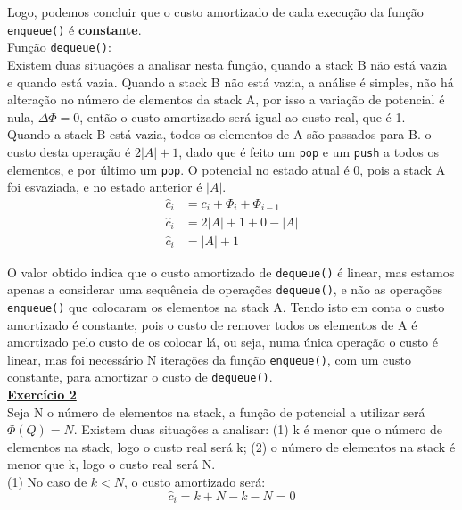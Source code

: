 \documentclass[a4paper,11pt]{article}
\begin{document}
	\noindent Logo, podemos concluir que o custo amortizado de cada execução da função \texttt{enqueue()} é \textbf{constante}.\\
	
	\noindent Função \texttt{dequeue()}:\\
	
	\noindent Existem duas situações a analisar nesta função, quando a stack B não está vazia e quando está vazia. Quando a stack B não está vazia, a análise é simples, não há alteração no número de elementos da stack A, por isso a variação de potencial é nula, $\Delta \Phi = 0$, então o custo amortizado será igual ao custo real, que é 1.\\
	
	\noindent Quando a stack B está vazia, todos os elementos de A são passados para B. o custo desta operação é $ 2 |A| + 1 $, dado que é feito um \texttt{pop} e um \texttt{push} a todos os elementos, e por último um \texttt{pop}. O potencial no estado atual é 0, pois a stack A foi esvaziada, e no estado anterior é $|A|$.
	\begin{align*}
		\hat{c}_i & = c_i + \Phi_i + \Phi_{i-1} \\
		\hat{c}_i & = 2 |A| + 1 + 0 - |A| \\
		\hat{c}_i & = |A| + 1
	\end{align*}
		
	\noindent O valor obtido indica que o custo amortizado de \texttt{dequeue()} é linear, mas estamos apenas a considerar uma sequência de operações \texttt{dequeue()}, e não as operações \texttt{enqueue()} que colocaram os elementos na stack A. Tendo isto em conta o custo amortizado é constante, pois o custo de remover todos os elementos de A é amortizado pelo custo de os colocar lá, ou seja, numa única operação o custo é linear, mas foi necessário N iterações da função \texttt{enqueue()}, com um custo constante, para amortizar o custo de \texttt{dequeue()}.\\


	\noindent \underline{\textbf{Exercício 2}}\\
	
	\noindent Seja N o número de elementos na stack, a função de potencial a utilizar será $\Phi(Q) = N$. Existem duas situações a analisar: (1) k é menor que o número de elementos na stack, logo o custo real será k; (2) o número de elementos na stack é menor que k, logo o custo real será N.\\
	
	\noindent (1) No caso de $ k < N $, o custo amortizado será:
	\[
		\hat{c}_i = k + N - k - N = 0
	\]
	
\end{document}
